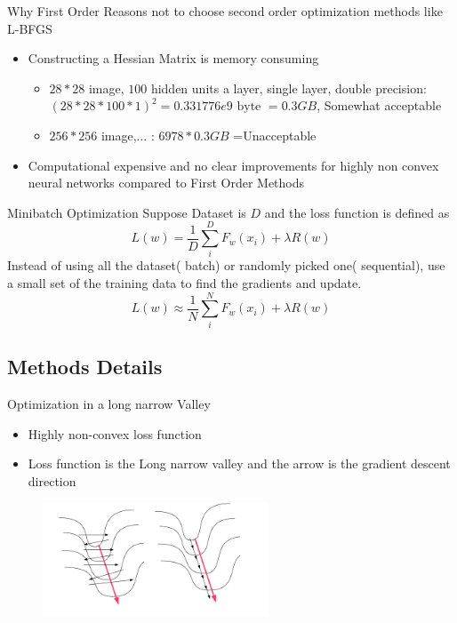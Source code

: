 \documentclass{beamer}
\begin{document}
\begin{frame}{Why First Order}
Reasons not to choose second order optimization methods like L-BFGS 
\begin{itemize}
\item Constructing a Hessian Matrix is memory consuming
\begin{itemize}
\item $28*28$ image, $100$ hidden units a layer, single layer, double precision: $(28*28*100*1)^2= 0.331776e9 \text{ byte }=0.3GB$, Somewhat acceptable 
\item $256*256$ image,... : $6978*0.3GB$ =Unacceptable 
\end{itemize}
\item Computational expensive and no clear improvements for highly non convex neural networks compared to First Order Methods
\end{itemize}
\end{frame}

\begin{frame}{Minibatch Optimization}
Suppose Dataset is $D$ and the loss function is defined as 
$$
L(w)=\frac{1}{D}\sum_i^D F_w(x_i)+\lambda R(w)
$$
Instead of using all the dataset( batch) or randomly picked one( sequential), use a small set of the training data to find the gradients and update.
$$
L(w)\approx \frac{1}{N} \sum_i^N F_w(x_i)+\lambda R(w)
$$
\end{frame}


\subsection{Methods Details}
\begin{frame}{Optimization in a long narrow Valley}
\begin{itemize}
\item Highly non-convex loss function
\item Loss function is the Long narrow valley and the arrow is the gradient descent direction
\end{itemize}
\begin{figure}[h!]
\centering
\includegraphics[width=0.6\textwidth]{narrow.png}
\end{figure}

\end{frame}
\end{document}
